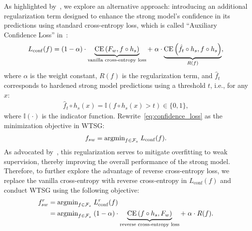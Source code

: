 As highlighted by~\citet{burns2023weak}, we explore an alternative approach: introducing an additional regularization term designed to enhance the strong model’s confidence in its predictions using standard cross-entropy loss, which is called ``Auxiliary Confidence Loss'' in~\citet{burns2023weak}:
\begin{align} \label{eq:confidence_loss}
    L_{\mathrm{conf}}(f)=(1-\alpha) \cdot \underbrace{\mathrm{CE} \left(F_w, f \circ h_s\right)}_{\text{vanilla cross-entropy loss}} + \; \alpha \cdot \underbrace{\mathrm{CE}\left(\hat{f}_t \circ h_s, f \circ h_s \right)}_{R(f)},
\end{align}
where $\alpha$ is the weight constant, $R(f)$ is the regularization term, and $\hat{f}_t$ corresponds to hardened strong model predictions using a threshold $t$, i.e., for any $x$:
\begin{align*}
    \hat{f}_t \circ h_s(x)= \mathbb{I}(f \circ h_s(x) > t) \in \{ 0,1 \},
\end{align*}
where $\mathbb{I}(\cdot)$ is the indicator function.
Rewrite~\cref{eq:confidence_loss} as the minimization objective in WTSG:
\begin{align}
    f_{sw} = \text{argmin}_{f \in \mathcal{F}_{s}}\; L_{\mathrm{conf}}(f).
\end{align}
As advocated by~\citet{burns2023weak}, this regularization serves to mitigate overfitting to weak supervision, thereby improving the overall performance of the strong model.
Therefore, to further explore the advantage of reverse cross-entropy loss, we replace the vanilla cross-entropy with reverse cross-entropy in $L_{\mathrm{conf}}(f)$ and conduct WTSG using the following objective:
\begin{align} \label{eq:reverse_confidence_loss}
    f_{sw}^r & = \text{argmin}_{f \in \mathcal{F}_{s}}\; L^r_{\mathrm{conf}}(f) \nonumber
    \\ & = \text{argmin}_{f \in \mathcal{F}_{s}}\; (1-\alpha) \cdot \underbrace{\mathrm{CE} \left(f \circ h_s, F_w\right)}_{\text{reverse cross-entropy loss}}+ \; \alpha \cdot R(f).
\end{align}

